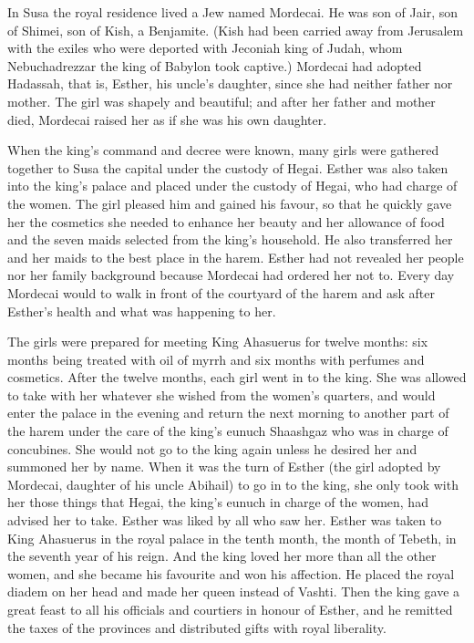  In Susa the royal residence lived a Jew named Mordecai. He
was son of Jair, son of Shimei, son of Kish, a Benjamite. 
(Kish had been carried away from Jerusalem with the exiles who were
deported with Jeconiah king of Judah, whom Nebuchadrezzar the king of
Babylon took captive.)  Mordecai had adopted Hadassah, that
is, Esther, his uncle's daughter, since she had neither father nor
mother. The girl was shapely and beautiful; and after her father and
mother died, Mordecai raised her as if she was his own daughter.

 When the king's command and decree were known, many girls
were gathered together to Susa the capital under the custody of Hegai.
Esther was also taken into the king's palace and placed under the
custody of Hegai, who had charge of the women.  The girl
pleased him and gained his favour, so that he quickly gave her the
cosmetics she needed to enhance her beauty and her allowance of food and
the seven maids selected from the king's household. He also transferred
her and her maids to the best place in the harem.  Esther
had not revealed her people nor her family background because Mordecai
had ordered her not to.  Every day Mordecai would to walk
in front of the courtyard of the harem and ask after Esther's health and
what was happening to her.

 The girls were prepared for meeting King Ahasuerus for
twelve months: six months being treated with oil of myrrh and six months
with perfumes and cosmetics. After the twelve months,  each
girl went in to the king. She was allowed to take with her whatever she
wished from the women's quarters,  and would enter the
palace in the evening and return the next morning to another part of the
harem under the care of the king's eunuch Shaashgaz who was in charge of
concubines. She would not go to the king again unless he desired her and
summoned her by name.  When it was the turn of Esther (the
girl adopted by Mordecai, daughter of his uncle Abihail) to go in to the
king, she only took with her those things that Hegai, the king's eunuch
in charge of the women, had advised her to take. Esther was liked by all
who saw her.  Esther was taken to King Ahasuerus in the
royal palace in the tenth month, the month of Tebeth, in the seventh
year of his reign.  And the king loved her more than all
the other women, and she became his favourite and won his affection. He
placed the royal diadem on her head and made her queen instead of
Vashti.  Then the king gave a great feast to all his
officials and courtiers in honour of Esther, and he remitted the taxes
of the provinces and distributed gifts with royal liberality.

